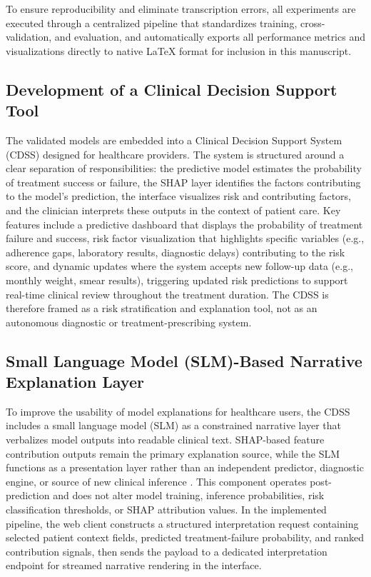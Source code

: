 \documentclass[12pt]{article}
\begin{document}
To ensure reproducibility and eliminate transcription errors, all experiments are executed through a centralized pipeline that standardizes training, cross-validation, and evaluation, and automatically exports all performance metrics and visualizations directly to native \LaTeX{} format for inclusion in this manuscript.

\subsection{Development of a Clinical Decision Support Tool}

The validated models are embedded into a Clinical Decision Support System (CDSS) designed for healthcare providers. The system is structured around a clear separation of responsibilities: the predictive model estimates the probability of treatment success or failure, the SHAP layer identifies the factors contributing to the model's prediction, the interface visualizes risk and contributing factors, and the clinician interprets these outputs in the context of patient care. Key features include a predictive dashboard that displays the probability of treatment failure and success, risk factor visualization that highlights specific variables (e.g., adherence gaps, laboratory results, diagnostic delays) contributing to the risk score, and dynamic updates where the system accepts new follow-up data (e.g., monthly weight, smear results), triggering updated risk predictions to support real-time clinical review throughout the treatment duration. The CDSS is therefore framed as a risk stratification and explanation tool, not as an autonomous diagnostic or treatment-prescribing system.

\subsection{Small Language Model (SLM)-Based Narrative Explanation Layer}

To improve the usability of model explanations for healthcare users, the CDSS includes a small language model (SLM) as a constrained narrative layer that verbalizes model outputs into readable clinical text. SHAP-based feature contribution outputs remain the primary explanation source, while the SLM functions as a presentation layer rather than an independent predictor, diagnostic engine, or source of new clinical inference \citep{ref39, ref41}. This component operates post-prediction and does not alter model training, inference probabilities, risk classification thresholds, or SHAP attribution values. In the implemented pipeline, the web client constructs a structured interpretation request containing selected patient context fields, predicted treatment-failure probability, and ranked contribution signals, then sends the payload to a dedicated interpretation endpoint for streamed narrative rendering in the interface.
\end{document}
